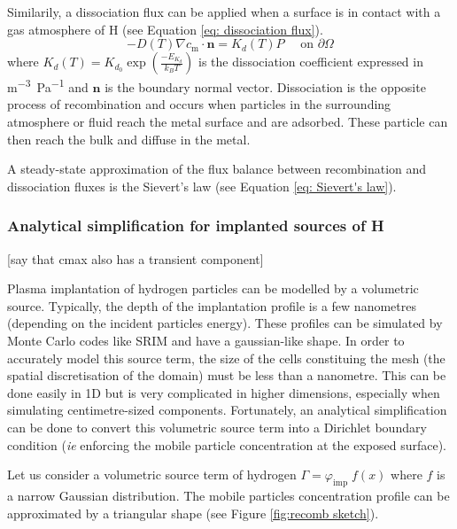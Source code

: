 Similarily, a dissociation flux can be applied when a surface is in contact with a gas atmosphere of H (see Equation \ref{eq: dissociation flux}).
\begin{equation}
    - D(T)\nabla c_\mathrm{m} \cdot \mathbf{n} = K_d(T) P \quad \text { on } \partial \Omega
    \label{eq: dissociation flux}
\end{equation}
where $K_d(T) = K_{d_0} \exp(\frac{-E_{K_d}}{k_B T}) $ is the dissociation coefficient expressed in \si{m^{-3}.Pa^{-1}} and $\mathbf{n}$ is the boundary normal vector.
Dissociation is the opposite process of recombination and occurs when particles in the surrounding atmosphere or fluid reach the metal surface and are adsorbed.
These particle can then reach the bulk and diffuse in the metal.

A steady-state approximation of the flux balance between recombination and dissociation fluxes is the Sievert's law (see Equation \ref{eq: Sievert's law}).

\subsubsection{Analytical simplification for implanted sources of H} \label{triangle model}
[say that cmax also has a transient component]

Plasma implantation of hydrogen particles can be modelled by a volumetric source.
Typically, the depth of the implantation profile is a few nanometres (depending on the incident particles energy).
These profiles can be simulated by Monte Carlo codes like SRIM  and have a gaussian-like shape.
In order to accurately model this source term, the size of the cells constituing the mesh (the spatial discretisation of the domain) must be less than a nanometre.
This can be done easily in 1D but is very complicated in higher dimensions, especially when simulating centimetre-sized components.
Fortunately, an analytical simplification can be done to convert this volumetric source term into a Dirichlet boundary condition (\textit{ie} enforcing the mobile particle concentration at the exposed surface).

Let us consider a volumetric source term of hydrogen $\Gamma = \varphi_\mathrm{imp} \; f(x)$ where $f$ is a narrow Gaussian distribution.
The mobile particles concentration profile can be approximated by a triangular shape  (see Figure \ref{fig:recomb sketch}).

